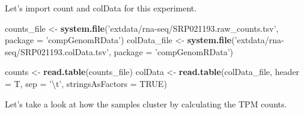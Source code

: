 \documentclass[12pt,]{krantz}
\newenvironment{Shaded}{\begin{snugshade}}{\end{snugshade}}
\newcommand{\CharTok}[1]{\textcolor[rgb]{0.31,0.60,0.02}{#1}}
\newcommand{\CommentTok}[1]{\textcolor[rgb]{0.56,0.35,0.01}{\textit{#1}}}
\newcommand{\ControlFlowTok}[1]{\textcolor[rgb]{0.13,0.29,0.53}{\textbf{#1}}}
\newcommand{\DataTypeTok}[1]{\textcolor[rgb]{0.13,0.29,0.53}{#1}}
\newcommand{\DecValTok}[1]{\textcolor[rgb]{0.00,0.00,0.81}{#1}}
\newcommand{\KeywordTok}[1]{\textcolor[rgb]{0.13,0.29,0.53}{\textbf{#1}}}
\newcommand{\NormalTok}[1]{#1}
\newcommand{\OperatorTok}[1]{\textcolor[rgb]{0.81,0.36,0.00}{\textbf{#1}}}
\newcommand{\OtherTok}[1]{\textcolor[rgb]{0.56,0.35,0.01}{#1}}
\newcommand{\StringTok}[1]{\textcolor[rgb]{0.31,0.60,0.02}{#1}}
\begin{document}
Let's import count and colData for this experiment.

\begin{Shaded}
\begin{Highlighting}[]
\NormalTok{counts_file <-}\StringTok{ }\KeywordTok{system.file}\NormalTok{(}\StringTok{'extdata/rna-seq/SRP021193.raw_counts.tsv'}\NormalTok{, }\DataTypeTok{package =} \StringTok{'compGenomRData'}\NormalTok{)}
\NormalTok{colData_file <-}\StringTok{ }\KeywordTok{system.file}\NormalTok{(}\StringTok{'extdata/rna-seq/SRP021193.colData.tsv'}\NormalTok{, }\DataTypeTok{package =} \StringTok{'compGenomRData'}\NormalTok{)}

\NormalTok{counts <-}\StringTok{ }\KeywordTok{read.table}\NormalTok{(counts_file)}
\NormalTok{colData <-}\StringTok{ }\KeywordTok{read.table}\NormalTok{(colData_file, }\DataTypeTok{header =}\NormalTok{ T, }\DataTypeTok{sep =} \StringTok{'}\CharTok{\textbackslash{}t}\StringTok{'}\NormalTok{, }\DataTypeTok{stringsAsFactors =} \OtherTok{TRUE}\NormalTok{)}
\end{Highlighting}
\end{Shaded}

Let's take a look at how the samples cluster by calculating the TPM counts.

\begin{Shaded}
\end{Shaded}
\end{document}
